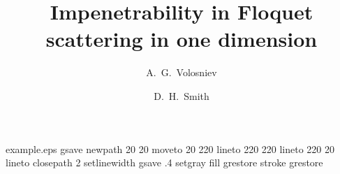 %
%
%
%
\begin{filecontents*}{example.eps}
gsave
newpath
  20 20 moveto
  20 220 lineto
  220 220 lineto
  220 20 lineto
closepath
2 setlinewidth
gsave
  .4 setgray fill
grestore
stroke
grestore
\end{filecontents*}
%
\documentclass[onecolumn, 12pt, draft]{revtex4-1}
%
\smartqed  %
%
\usepackage{graphicx}
%
%
\usepackage{amsmath, amssymb}
\usepackage{color}
%
%
%



\title{Impenetrability in Floquet scattering in one dimension}
\author{A.~G.~Volosniev \and D.~H.~Smith}





